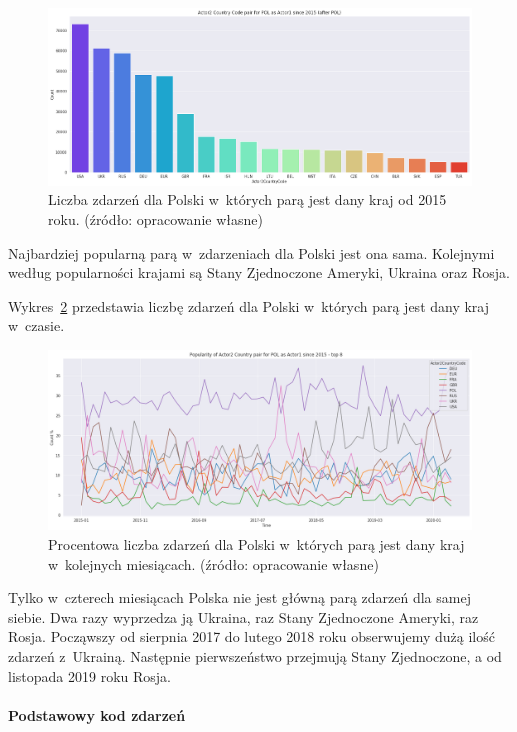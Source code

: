 \documentclass[11pt]{report}
\begin{document}
    \begin{figure}[!htp]
        \centering
        \includegraphics[width=\linewidth]{fig/PL/PLactor2Pair.png}
        \caption{Liczba zdarzeń dla Polski w~których parą jest dany kraj od 2015 roku. (źródło: opracowanie własne)}
        \label{fig:PLpair}
    \end{figure}
    Najbardziej popularną parą w~zdarzeniach dla Polski jest ona sama.
    Kolejnymi według popularności krajami są Stany Zjednoczone Ameryki, Ukraina oraz Rosja.

    Wykres~\ref{fig:PLpairPerc} przedstawia liczbę zdarzeń dla Polski w~których parą jest dany kraj w~czasie.
    \begin{figure}[!htp]
        \centering
        \includegraphics[width=\linewidth]{fig/PL/PLactor2PairPercinTIME.png}
        \caption{Procentowa liczba zdarzeń dla Polski w~których parą jest dany kraj w~kolejnych miesiącach. (źródło: opracowanie własne)}
        \label{fig:PLpairPerc}
    \end{figure}
    Tylko w~czterech miesiącach Polska nie jest główną parą zdarzeń dla samej siebie.
    Dwa razy wyprzedza ją Ukraina, raz Stany Zjednoczone Ameryki, raz Rosja.
    Począwszy od sierpnia 2017 do lutego 2018 roku obserwujemy dużą ilość zdarzeń z~Ukrainą.
    Następnie pierwszeństwo przejmują Stany Zjednoczone, a od listopada 2019 roku Rosja.

    \paragraph{Podstawowy kod zdarzeń}
\end{document}
